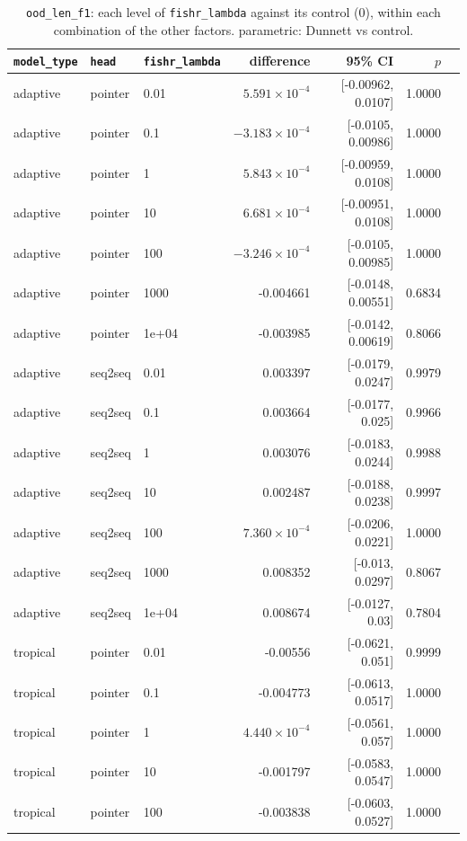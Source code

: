 \documentclass[10pt]{article}
\begin{document}
{\small
\begin{longtable}{lllrrrl}
\caption{\texttt{ood\_len\_f1}: each level of \texttt{fishr\_lambda} against its control (0), within each combination of the other factors. parametric: Dunnett vs control.}\label{tab:control-ood_len_f1}\\
\toprule
\texttt{model\_type} & \texttt{head} & \texttt{fishr\_lambda} & difference & 95\% CI & $p$ & \\
\midrule
\endhead
adaptive & pointer & 0.01 & $5.591\times10^{-4}$ & [-0.00962, 0.0107] & 1.0000 & \\
adaptive & pointer & 0.1 & $-3.183\times10^{-4}$ & [-0.0105, 0.00986] & 1.0000 & \\
adaptive & pointer & 1 & $5.843\times10^{-4}$ & [-0.00959, 0.0108] & 1.0000 & \\
adaptive & pointer & 10 & $6.681\times10^{-4}$ & [-0.00951, 0.0108] & 1.0000 & \\
adaptive & pointer & 100 & $-3.246\times10^{-4}$ & [-0.0105, 0.00985] & 1.0000 & \\
adaptive & pointer & 1000 & -0.004661 & [-0.0148, 0.00551] & 0.6834 & \\
adaptive & pointer & 1e+04 & -0.003985 & [-0.0142, 0.00619] & 0.8066 & \\
adaptive & seq2seq & 0.01 & 0.003397 & [-0.0179, 0.0247] & 0.9979 & \\
adaptive & seq2seq & 0.1 & 0.003664 & [-0.0177, 0.025] & 0.9966 & \\
adaptive & seq2seq & 1 & 0.003076 & [-0.0183, 0.0244] & 0.9988 & \\
adaptive & seq2seq & 10 & 0.002487 & [-0.0188, 0.0238] & 0.9997 & \\
adaptive & seq2seq & 100 & $7.360\times10^{-4}$ & [-0.0206, 0.0221] & 1.0000 & \\
adaptive & seq2seq & 1000 & 0.008352 & [-0.013, 0.0297] & 0.8067 & \\
adaptive & seq2seq & 1e+04 & 0.008674 & [-0.0127, 0.03] & 0.7804 & \\
tropical & pointer & 0.01 & -0.00556 & [-0.0621, 0.051] & 0.9999 & \\
tropical & pointer & 0.1 & -0.004773 & [-0.0613, 0.0517] & 1.0000 & \\
tropical & pointer & 1 & $4.440\times10^{-4}$ & [-0.0561, 0.057] & 1.0000 & \\
tropical & pointer & 10 & -0.001797 & [-0.0583, 0.0547] & 1.0000 & \\
tropical & pointer & 100 & -0.003838 & [-0.0603, 0.0527] & 1.0000 & \\

\end{longtable}}
\end{document}

